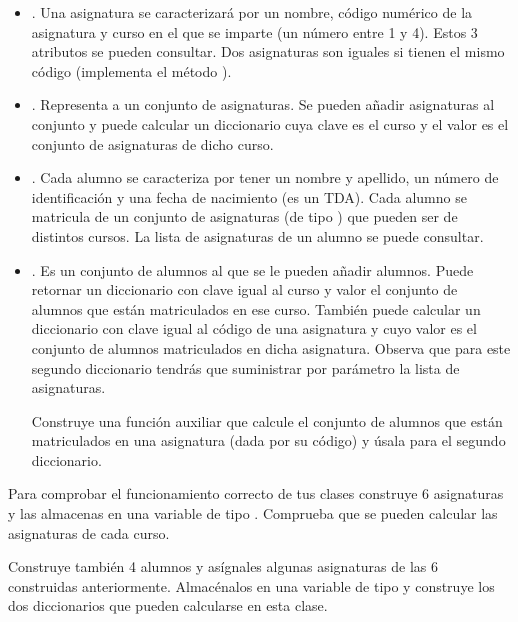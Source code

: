 \begin{itemize}
\item {}. Una asignatura se caracterizará por un nombre, código numérico de la asignatura y curso en el que se imparte (un número entre 1 y 4). Estos 3 atributos se pueden consultar. Dos asignaturas son iguales si tienen el mismo código (implementa el método ).

\item {}. Representa a un conjunto de asignaturas. Se pueden añadir asignaturas al conjunto y puede calcular un diccionario cuya clave es el curso y el valor es el conjunto de asignaturas de dicho curso.

\item {}. Cada alumno se caracteriza por tener un nombre y apellido, un número de identificación y una fecha de nacimiento (es un TDA). Cada alumno se matricula de un conjunto de asignaturas (de tipo ) que pueden ser de distintos cursos. La lista de asignaturas de un alumno se puede consultar.

\item {}. Es un conjunto de alumnos al que se le pueden añadir alumnos.
Puede retornar un diccionario con clave igual al curso y valor el conjunto de alumnos que están matriculados en ese curso. También puede calcular un diccionario con clave igual al código de una asignatura y cuyo valor es el conjunto de alumnos matriculados en dicha asignatura. Observa que para este segundo diccionario tendrás que suministrar por parámetro la lista de asignaturas.

Construye una función auxiliar que calcule el conjunto de alumnos que están matriculados en una asignatura (dada por su código) y úsala para el segundo diccionario.
\end{itemize}

Para comprobar el funcionamiento correcto de tus clases construye 6 asignaturas y las almacenas en una variable de tipo  . Comprueba que se pueden calcular las asignaturas de cada curso.

Construye también 4 alumnos y asígnales algunas asignaturas de las 6 construidas anteriormente. Almacénalos en una variable de tipo  y construye los dos diccionarios que pueden calcularse en esta clase.


 



